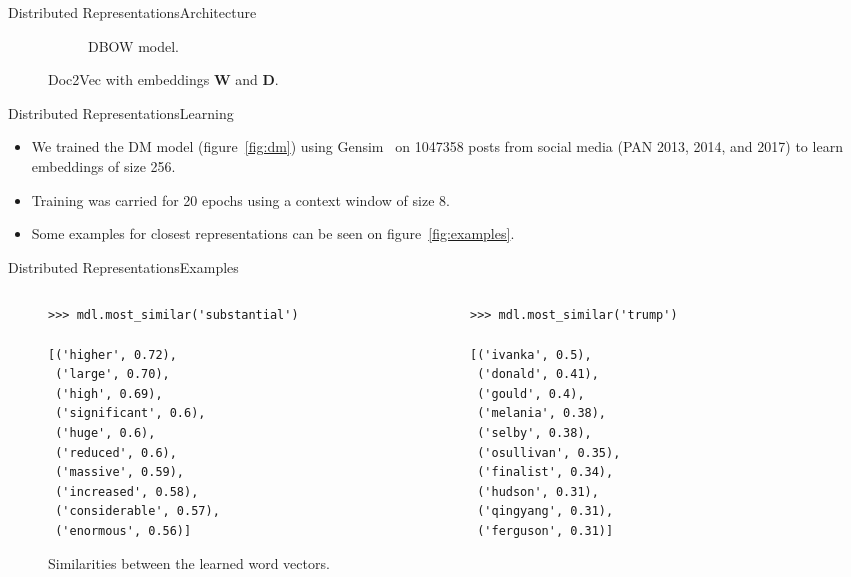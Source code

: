 \documentclass[usepdftitle=false]{beamer}
\newcommand*{\mat}{\symbf}%
\begin{document}
\begin{frame}{Distributed Representations}{Architecture}
\begin{figure}
\begin{subfigure}[b]{.40\textwidth}
      \caption{DBOW model.}\label{fig:dbow}
    \end{subfigure}
    \caption{\textsf{Doc2Vec} with embeddings \(\mat W\) and \(\mat D\).}
  \end{figure}
\end{frame}

\begin{frame}{Distributed Representations}{Learning}
  \begin{itemize}
  \item We trained the DM model (figure~\autoref{fig:dm}) using
    Gensim~\autocite{RS12} on \num{1047358} posts from social media
    (PAN 2013, 2014, and 2017) to learn embeddings of size \num{256}.
  \item Training was carried for \num{20} epochs using a context
    window of size \num{8}.
  \item Some examples for closest representations can be seen on
    figure~\autoref{fig:examples}.
  \end{itemize}
\end{frame}

\begin{frame}[fragile]{Distributed Representations}{Examples}%
  \begin{figure}
    \begin{columns}
      \begin{column}{.5\textwidth}
\begin{verbatim}
>>> mdl.most_similar('substantial')

[('higher', 0.72),
 ('large', 0.70),
 ('high', 0.69),
 ('significant', 0.6),
 ('huge', 0.6),
 ('reduced', 0.6),
 ('massive', 0.59),
 ('increased', 0.58),
 ('considerable', 0.57),
 ('enormous', 0.56)]
\end{verbatim}
      \end{column}%
      \begin{column}{.5\textwidth}
\begin{verbatim}
>>> mdl.most_similar('trump')

[('ivanka', 0.5),
 ('donald', 0.41),
 ('gould', 0.4),
 ('melania', 0.38),
 ('selby', 0.38),
 ('osullivan', 0.35),
 ('finalist', 0.34),
 ('hudson', 0.31),
 ('qingyang', 0.31),
 ('ferguson', 0.31)]
\end{verbatim}
      \end{column}
    \end{columns}
    \caption{Similarities between the learned word
      vectors.}\label{fig:examples}
  \end{figure}
\end{frame}
\end{document}
